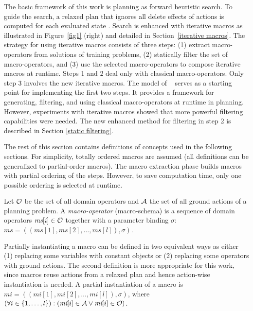 \documentclass{article}
\begin{document}
The basic framework of this work is planning as forward heuristic search.
To guide the search, a relaxed plan that ignores all delete effects
of actions is computed for each evaluated state \cite{Hoffmann:01a}.
Search is enhanced with iterative macros as illustrated in 
Figure~\ref{fig1} (right) and detailed in Section~\ref{iterative macros}.
The strategy for using iterative macros consists of
three steps: 
(1) extract macro-operators from solutions of training problems,
(2) statically filter the set of macro-operators, and
(3) use the selected macro-operators to compose iterative macros at runtime.
Steps 1 and 2 deal only with classical macro-operators.
Only step 3 involves the new iterative macros.
The model of \citeauthor{Botea:05}~\citeyear{Botea:05}
serves as a starting point for implementing the first two steps.
It provides a framework for generating, filtering,
and using classical macro-operators at runtime in planning.
However, experiments with iterative macros showed that
more powerful filtering capabilities were needed. The new enhanced method for
filtering in step 2 is described in Section \ref{static filtering}.

The rest of this section contains definitions of concepts
used in the following sections.
For simplicity, totally ordered macros are assumed
(all definitions can be generalized to partial-order macros).
The macro extraction phase builds macros 
with partial ordering of the steps.
However, to save computation time, only one possible ordering
is selected at runtime.

Let $\cal{O}$ be the set of all domain operators
and $\cal{A}$ the set of all ground actions of a planning problem.
A \emph{macro-operator} (macro-schema) is a sequence of 
domain operators $\textit{ms}[i] \in \cal{O}$
together with a parameter binding $\sigma$:
$\textit{ms} = ((\textit{ms}[1], \textit{ms}[2], \dots, \textit{ms}[l]), \sigma)$.

Partially instantiating a macro can be defined in two equivalent ways as either
(1) replacing some variables with constant objects or (2) replacing some operators
with ground actions. The second definition is more appropriate for this work,
since macros reuse actions from a relaxed plan 
and hence action-wise instantiation is needed.
A partial instantiation of a macro is 
$\textit{mi} = ((\textit{mi}[1], \textit{mi}[2], \dots, \textit{mi}[l]), \sigma)$, 
where $(\forall i \in \{1, \dots, l\}): (\textit{mi}[i] \in {\cal{A}} \vee \textit{mi}[i] \in {\cal{O}})$.
\end{document}
